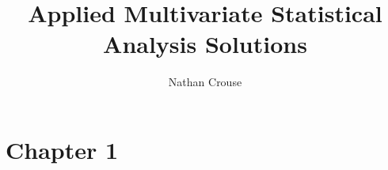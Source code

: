 \documentclass{article}
\begin{document}
\title{Applied Multivariate Statistical Analysis Solutions}
\author{Nathan Crouse}
\maketitle

\tableofcontents

\section{Chapter 1}

%     
%     
%     

%
% 
% 
% 
% 
% 
% 
\subsection{}

\subsection{}

\subsection{}

\subsection{}

\end{document}
